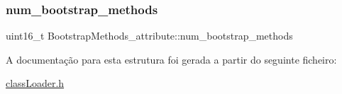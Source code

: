 \subsubsection{\texorpdfstring{num\+\_\+bootstrap\+\_\+methods}{num\_bootstrap\_methods}}
{\footnotesize\ttfamily uint16\+\_\+t Bootstrap\+Methods\+\_\+attribute\+::num\+\_\+bootstrap\+\_\+methods}



A documentação para esta estrutura foi gerada a partir do seguinte ficheiro\+:\begin{DoxyCompactItemize}
\item 
\hyperlink{class_loader_8h}{class\+Loader.\+h}\end{DoxyCompactItemize}
